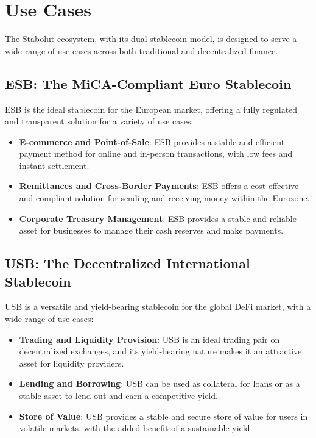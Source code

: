 \section{Use Cases}
The Stabolut ecosystem, with its dual-stablecoin model, is designed to serve a wide range of use cases across both traditional and decentralized finance.

\subsection{ESB: The MiCA-Compliant Euro Stablecoin}
ESB is the ideal stablecoin for the European market, offering a fully regulated and transparent solution for a variety of use cases:
\begin{itemize}
    \item \textbf{E-commerce and Point-of-Sale}: ESB provides a stable and efficient payment method for online and in-person transactions, with low fees and instant settlement.
    \item \textbf{Remittances and Cross-Border Payments}: ESB offers a cost-effective and compliant solution for sending and receiving money within the Eurozone.
    \item \textbf{Corporate Treasury Management}: ESB provides a stable and reliable asset for businesses to manage their cash reserves and make payments.
\end{itemize}

\subsection{USB: The Decentralized International Stablecoin}
USB is a versatile and yield-bearing stablecoin for the global DeFi market, with a wide range of use cases:
\begin{itemize}
    \item \textbf{Trading and Liquidity Provision}: USB is an ideal trading pair on decentralized exchanges, and its yield-bearing nature makes it an attractive asset for liquidity providers.
    \item \textbf{Lending and Borrowing}: USB can be used as collateral for loans or as a stable asset to lend out and earn a competitive yield.
    \item \textbf{Store of Value}: USB provides a stable and secure store of value for users in volatile markets, with the added benefit of a sustainable yield.
\end{itemize} 

